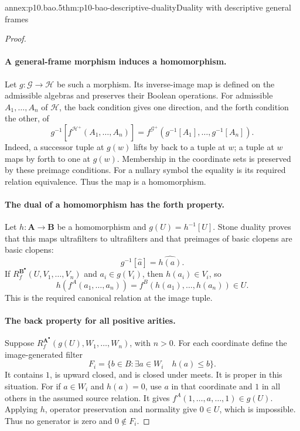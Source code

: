 \begin{annexitem}{annex:p10.bao.5}{thm:p10-bao-descriptive-duality}{Duality with descriptive general frames}
\begin{proof}
\paragraph{A general-frame morphism induces a homomorphism.}
Let \(g:\mathcal G\to\mathcal H\) be such a morphism.
Its inverse-image map is defined on the admissible algebras and
preserves their Boolean operations.
For admissible \(A_1,\ldots,A_n\) of \(\mathcal H\), the back
condition gives one direction, and the forth condition the other,
of
\[
 g^{-1}[f^{\mathcal H^+}(A_1,\ldots,A_n)]
   =f^{\mathcal G^+}(g^{-1}[A_1],\ldots,g^{-1}[A_n]).
\]
Indeed, a successor tuple at \(g(w)\) lifts by back to a tuple
at \(w\); a tuple at \(w\) maps by forth to one at \(g(w)\).
Membership in the coordinate sets is preserved by these
preimage conditions.
For a nullary symbol the equality is its required relation
equivalence. Thus the map is a homomorphism.

\paragraph{The dual of a homomorphism has the forth property.}
Let \(h:\mathbf A\to\mathbf B\) be a homomorphism and
\(g(U)=h^{-1}[U]\).
Stone duality proves that this maps ultrafilters to ultrafilters
and that preimages of basic clopens are basic clopens:
\[
 g^{-1}[\widehat a]=\widehat{h(a)}.
\]
If \(R_f^{\mathbf B^\bullet}(U,V_1,\ldots,V_n)\) and
\(a_i\in g(V_i)\), then \(h(a_i)\in V_i\), so
\[
 h(f^A(a_1,\ldots,a_n))
       =f^B(h(a_1),\ldots,h(a_n))\in U.
\]
This is the required canonical relation at the image tuple.

\paragraph{The back property for all positive arities.}
Suppose \(R_f^{\mathbf A^\bullet}(g(U),W_1,\ldots,W_n)\),
with \(n>0\).
For each coordinate define the image-generated filter
\[
 F_i=\{b\in B:\exists a\in W_i\quad h(a)\leq b\}.
\]
It contains \(1\), is upward closed, and is closed under meets.
It is proper in this situation.
For if \(a\in W_i\) and \(h(a)=0\), use \(a\) in that coordinate
and \(1\) in all others in the assumed source relation.
It gives \(f^A(1,\ldots,a,\ldots,1)\in g(U)\).
Applying \(h\), operator preservation and normality give \(0\in U\),
which is impossible.
Thus no generator is zero and \(0\notin F_i\).


\end{proof}
\end{annexitem}
